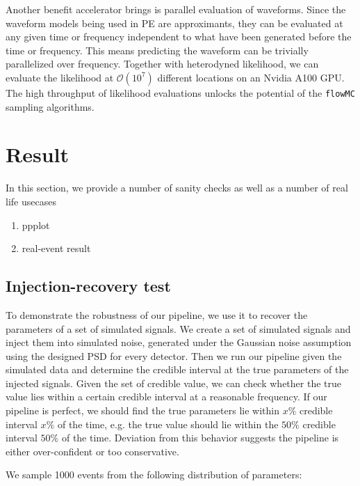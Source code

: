 \documentclass[twocolumn]{aastex631}
\begin{document}
Another benefit accelerator brings is parallel evaluation of waveforms. Since
the waveform models being used in PE are approximants, they can be evaluated at
any given time or frequency independent to what have been generated before the
time or frequency. This means predicting the waveform can be trivially
parallelized over frequency. Together with heterodyned likelihood, we can
evaluate the likelihood at $\mathcal{O}(10^7)$ different locations on an Nvidia
A100 GPU. The high throughput of likelihood evaluations unlocks the potential of
the \texttt{flowMC} sampling algorithms.

\section{Result}
\label{sec: Result}

In this section, we provide a number of sanity checks as well as a number of real life usecases

\begin{enumerate}
    \item ppplot
    \item real-event result
\end{enumerate}

\subsection{Injection-recovery test}

To demonstrate the robustness of our pipeline, we use it to recover the
parameters of a set of simulated signals. We create a set of simulated signals
and inject them into simulated noise, generated under the Gaussian noise
assumption using the designed PSD for every detector. Then we run our pipeline
given the simulated data and determine the credible interval at the true
parameters of the injected signals. Given the set of credible value, we can
check whether the true value lies within a certain credible interval at a
reasonable frequency. If our pipeline is perfect, we should find the true
parameters lie within $x\%$ credible interval $x\%$ of the time, e.g. the true
value should lie within the $50\%$ credible interval $50\%$ of the time.
Deviation from this behavior suggests the pipeline is either over-confident or
too conservative.

We sample 1000 events from the following distribution of parameters:
\end{document}
